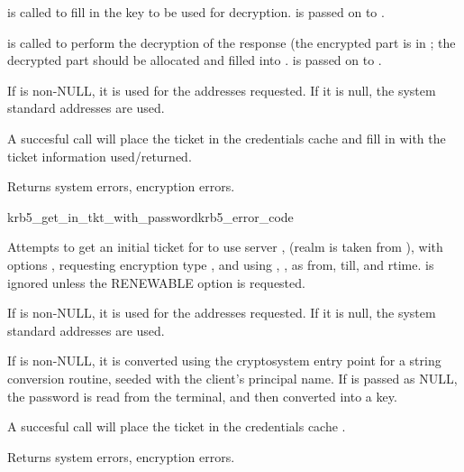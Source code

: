  is called to fill in the key to be used for decryption.
 is passed on to .

 is called to perform the decryption of the
response (the encrypted part is in ; the
decrypted part should be allocated and filled into
.
 is passed on to .

If  is non-NULL, it is used for the addresses
requested.  If it is null, the system standard addresses are used.

A succesful call will place the ticket in the credentials cache
 and fill in  with the ticket
information used/returned.

Returns system errors, encryption errors.

\begin{funcdecl}{krb5_get_in_tkt_with_password}{krb5_error_code}{\funcin}
\funcinout
{}
\end{funcdecl}


Attempts to get an initial ticket for  to use server
, (realm is taken from
), with options 
, requesting encryption type , and using
,
,
as from, till, and rtime.   is
ignored unless the RENEWABLE option is requested.

If  is non-NULL, it is used for the addresses
requested.  If it is null, the system standard addresses are used.

If  is non-NULL, it is converted using the
cryptosystem entry point for a string conversion routine, seeded with
the client's principal name.  If  is passed as NULL,
the password is read from the terminal, and then converted into a key.

A succesful call will place the ticket in the credentials cache
.

Returns system errors, encryption errors.


